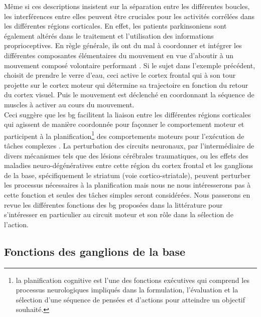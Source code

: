 Même si ces descriptions insistent sur la séparation entre les différentes boucles, les interférences entre elles peuvent être cruciales pour les activités corrélées dans les différentes régions corticales. En effet, les patients parkinsoniens sont également altérés dans le traitement et l'utilisation des informations proprioceptives. En règle générale, ils ont du mal  à coordonner et intégrer les différentes composantes élémentaires du mouvement en vue d'aboutir à un mouvement composé volontaire performant \cite{Schettino:2006}. Si le sujet dans l'exemple précédent, choisit de prendre le verre d'eau, ceci active le cortex frontal qui à son tour projette sur le cortex moteur qui détermine sa trajectoire en fonction du retour du cortex visuel. Puis le mouvement est déclenché en coordonnant la séquence de muscles à activer au cours du mouvement.\\

Ceci suggère que les \gls{bg} facilitent la liaison entre les différentes régions corticales qui agissent de manière coordonnée pour façonner le comportement moteur et participent à la planification\footnote{la planification cognitive est l'une des fonctions exécutives qui comprend les processus neurologiques impliqués dans la formulation, l'évaluation et la sélection d'une séquence de pensées et d'actions pour atteindre un objectif souhaité.} des comportements moteurs pour l'exécution de tâches complexes \cite{Elsinger:2006, Wu:2005, Houk:1995}. La perturbation des circuits neuronaux, par l'intermédiaire de divers mécanismes tels que des lésions cérébrales traumatiques, ou les effets des maladies neuro-dégénératives entre cette région du cortex frontal et les ganglions de la base, spécifiquement le striatum (voie cortico-striatale), peuvent perturber les processus nécessaires à la planification \cite{Houk:1995} mais nous ne nous intéresserons pas à cette fonction et seules des tâches simples seront considérées. Nous passerons en revue les différentes fonctions des \gls{bg} proposées dans la littérature pour s'intéresser en particulier au circuit moteur et son rôle dans la sélection de l'action.\\

\subsection{Fonctions des ganglions de la base}

